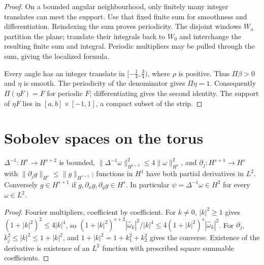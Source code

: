 \begin{proof}
\leanok
On a bounded angular neighbourhood, only finitely many integer translates
can meet the support. Use that fixed finite sum for smoothness and
differentiation. Reindexing the sum proves periodicity. The disjoint
windows $W_n$ partition the plane; translate their integrals back to
$W_0$ and interchange the resulting finite sum and integral. Periodic
multipliers may be pulled through the sum, giving the localized formula.

Every angle has an integer translate in $[-\frac14,\frac34)$, where
$\rho$ is positive. Thus $\Pi\beta>0$ and $\eta$ is smooth. The
periodicity of the denominator gives $\Pi\eta=1$. Consequently
$\Pi(\eta F)=F$ for periodic $F$; differentiating gives the second
identity. The support of $\eta F$ lies in $[a,b]\times[-1,1]$, a compact
subset of the strip.
\end{proof}

\section{Sobolev spaces on the torus}

\begin{lemma}
\label{lem:elliptic-torus}
\leanok
$\Delta^{-1}:H^s\to H^{s+2}$ is bounded, $\|\Delta^{-1}\omega\|_{H^{s+2}}^2\le
4\|\omega\|_{H^s}^2$, and $\partial_j:H^{s+1}\to H^s$ with
$\|\partial_jg\|_{H^s}\le\|g\|_{H^{s+1}}$; functions in $H^1$ have both partial
derivatives in $L^2$. Conversely $g\in H^{s+1}$ if $g,\partial_xg,\partial_yg\in H^s$.
In particular $\psi=\Delta^{-1}\omega\in H^2$ for every $\omega\in L^2$.
\end{lemma}

\begin{proof}
\leanok
Fourier multipliers, coefficient by coefficient. For $k\ne0$, $|k|^2\ge1$ gives
$(1+|k|^2)^2\le4|k|^4$, so $(1+|k|^2)^{s+2}|\hat\omega_k|^2/|k|^4\le
4(1+|k|^2)^s|\hat\omega_k|^2$. For $\partial_j$, $k_j^2\le|k|^2\le1+|k|^2$, and
$1+|k|^2=1+k_1^2+k_2^2$ gives the converse. Existence of the derivative is
existence of an $L^2$ function with prescribed square summable coefficients.
\end{proof}

